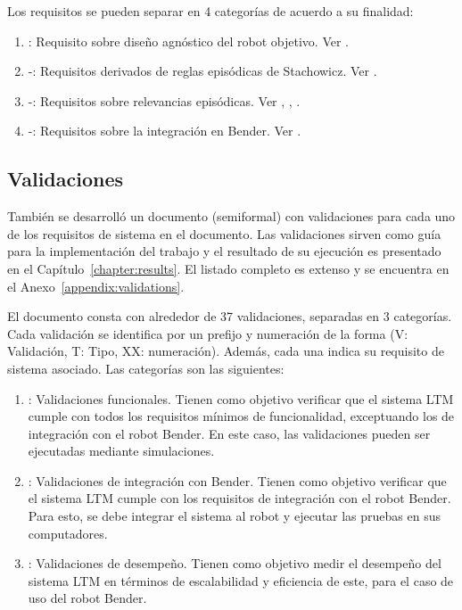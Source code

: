 Los requisitos se pueden separar en 4 categorías de acuerdo a su finalidad:
\begin{enumerate}
\item {}: Requisito sobre diseño agnóstico del robot objetivo. Ver .
\item {}-: Requisitos derivados de reglas episódicas de Stachowicz. Ver .
\item {}-: Requisitos sobre relevancias episódicas. Ver , , .
\item {}-: Requisitos sobre la integración en Bender. Ver .
\end{enumerate}

\subsection{Validaciones}

También se desarrolló un documento (semiformal) con validaciones para cada uno de los requisitos de sistema en el documento. Las validaciones sirven como guía para la implementación del trabajo y el resultado de su ejecución es presentado en el Capítulo~\ref{chapter:results}. El listado completo es extenso y se encuentra en el Anexo~\ref{appendix:validations}.

El documento consta con alrededor de 37 validaciones, separadas en 3 categorías. Cada validación se identifica por un prefijo y numeración de la forma  (V: Validación, T: Tipo, XX: numeración). Además, cada una indica su requisito de sistema asociado. Las categorías son las siguientes:
\begin{enumerate}
	\item {}: Validaciones funcionales. Tienen como objetivo verificar que el sistema LTM cumple con todos los requisitos mínimos de funcionalidad, exceptuando los de integración con el robot Bender. En este caso, las validaciones pueden ser ejecutadas mediante simulaciones.
	\item {}: Validaciones de integración con Bender. Tienen como objetivo verificar que el sistema LTM cumple con los requisitos de integración con el robot Bender. Para esto, se debe integrar el sistema al robot y ejecutar las pruebas en sus computadores.
	\item {}: Validaciones de desempeño. Tienen como objetivo medir el desempeño del sistema LTM en términos de escalabilidad y eficiencia de este, para el caso de uso del robot Bender.
\end{enumerate}

